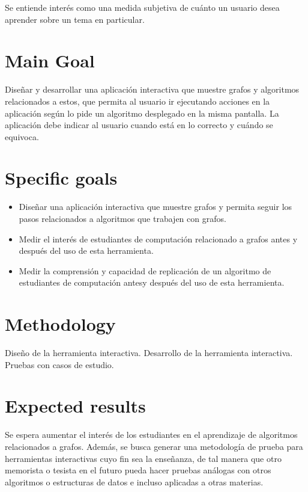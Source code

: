 \documentclass[submission]{eptcs}
\begin{document}
Se entiende interés como una medida subjetiva de cuánto un usuario desea
aprender sobre un tema en particular. 

\section{Main Goal}

Diseñar y desarrollar una aplicación interactiva que muestre grafos y 
algoritmos relacionados a estos, que permita al usuario ir ejecutando
acciones en la aplicación según lo pide un algoritmo desplegado en la misma
pantalla. La aplicación debe indicar al usuario cuando está en lo correcto
y cuándo se equivoca.

\section{Specific goals}

\begin{itemize}
\item Diseñar una aplicación interactiva que muestre grafos y permita seguir
los pasos relacionados a algoritmos que trabajen con grafos.

\item Medir el interés de estudiantes de computación relacionado a grafos
antes y después del uso de esta herramienta.

\item Medir la comprensión y capacidad de replicación de un algoritmo de 
estudiantes de computación antesy después del uso de esta herramienta.


\end{itemize}

\section{Methodology}

Diseño de la herramienta interactiva.
Desarrollo de la herramienta interactiva.
Pruebas con casos de estudio.


\section{Expected results}

Se espera aumentar el interés de los estudiantes en el aprendizaje de algoritmos
relacionados a grafos. Además, se busca generar una metodología de prueba para
herramientas interactivas cuyo fin sea la enseñanza, de tal manera que otro
memorista o tesista en el futuro pueda hacer pruebas análogas con otros algoritmos
o estructuras de datos e incluso aplicadas a otras materias.

\nocite{*}


\end{document}

